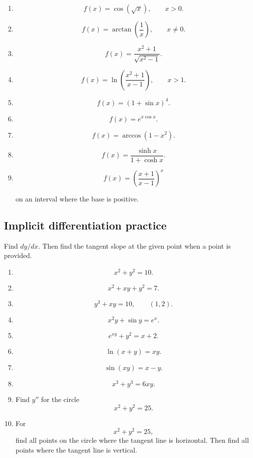 \begin{enumerate}
\item
\[
f(x)=\cos(\sqrt{x}),
\qquad x>0.
\]

\item
\[
f(x)=\arctan\left(\frac{1}{x}\right),
\qquad x\neq0.
\]

\item
\[
f(x)=\frac{x^2+1}{\sqrt{x^2-1}}.
\]

\item
\[
f(x)=\ln\left(\frac{x^2+1}{x-1}\right),
\qquad x>1.
\]

\item
\[
f(x)=(1+\sin x)^{4}.
\]

\item
\[
f(x)=e^{x\cos x}.
\]

\item
\[
f(x)=\arccos(1-x^2).
\]

\item
\[
f(x)=\frac{\sinh x}{1+\cosh x}.
\]

\item
\[
f(x)=\left(\frac{x+1}{x-1}\right)^x
\]

on an interval where the base is positive.
\end{enumerate}

\subsection{Implicit differentiation practice}
\label{subsec:implicit-differentiation-practice-chapter-5}

Find \(dy/dx\).  Then find the tangent slope at the given point when a point is provided.

\begin{enumerate}
\item
\[
x^2+y^2=10.
\]

\item
\[
x^2+xy+y^2=7.
\]

\item
\[
y^3+xy=10,
\qquad (1,2).
\]

\item
\[
x^2y+\sin y=e^x.
\]

\item
\[
e^{xy}+y^2=x+2.
\]

\item
\[
\ln(x+y)=xy.
\]

\item
\[
\sin(xy)=x-y.
\]

\item
\[
x^3+y^3=6xy.
\]

\item
Find \(y''\) for the circle
\[
x^2+y^2=25.
\]

\item
For
\[
x^2+y^2=25,
\]
find all points on the circle where the tangent line is horizontal.  Then find all points where the tangent line is vertical.
\end{enumerate}

